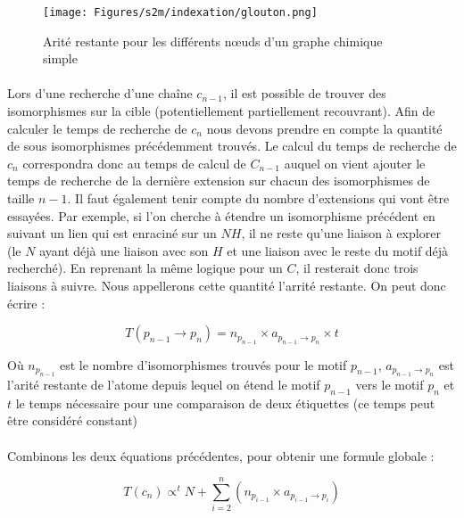 \documentclass[12pt,french,twoside]{report}
\begin{document}
\begin{figure}
  \texttt{[image: Figures/s2m/indexation/glouton.png]}
  \caption{\label{arrite}Arité restante pour les différents n\oe{}uds d'un graphe chimique simple}
\end{figure}

\paragraph{}Lors d'une recherche d'une chaîne $c_{n-1}$, il est possible de trouver des isomorphismes sur la cible (potentiellement partiellement recouvrant).
Afin de calculer le temps de recherche de $c_n$ nous devons prendre en compte la quantité de sous isomorphismes précédemment trouvés.
Le calcul du temps de recherche de $c_n$ correspondra donc au temps de calcul de $C_{n-1}$ auquel on vient ajouter le temps de recherche de la dernière extension sur chacun des isomorphismes de taille $n-1$.
Il faut également tenir compte du nombre d'extensions qui vont être essayées.
Par exemple, si l'on cherche à étendre un isomorphisme précédent en suivant un lien qui est enraciné sur un $NH$, il ne reste qu'une liaison à explorer (le $N$ ayant déjà une liaison avec son $H$ et une liaison avec le reste du motif déjà recherché).
En reprenant la même logique pour un $C$, il resterait donc trois liaisons à suivre.
Nous appellerons cette quantité l'arrité restante.
On peut donc écrire :

\begin{equation}
 T(p_{n-1} \rightarrow p_n) = n_{p_{n-1}} \times a_{p_{n-1} \rightarrow p_n} \times t
\end{equation}

Où $n_{p_{n-1}}$ est le nombre d'isomorphismes trouvés pour le motif $p_{n-1}$, $a_{p_{n-1} \rightarrow p_n}$ est l'arité restante
de l'atome depuis lequel on étend le motif $p_{n-1}$ vers le motif $p_n$ et $t$ le temps nécessaire pour une comparaison de deux
étiquettes (ce temps peut être considéré constant)

\paragraph{}Combinons les deux équations précédentes, pour obtenir une formule globale :

\begin{equation}
 T(c_n) \propto^t N + \sum_{i=2}^n (n_{p_{i-1}} \times a_{p_{i-1} \rightarrow p_i})
\end{equation}
\end{document}
